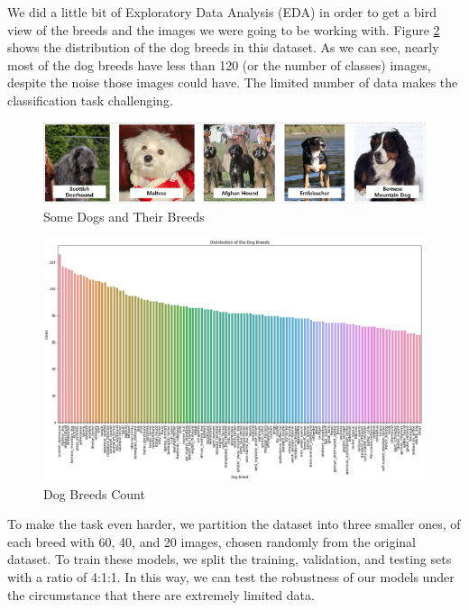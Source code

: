 \documentclass{article}
\begin{document}
We did a little bit of Exploratory Data Analysis (EDA) in order to get a bird view of the breeds and the images we were going to be working with. Figure \ref{fig:eda} shows the distribution of the dog breeds in this dataset. As we can see, nearly most of the dog breeds have less than 120 (or the number of classes) images, despite the noise those images could have. The limited number of data makes the classification task challenging.
\begin{figure}[h!]
    \centering
    \includegraphics[width=12cm]{dogs.PNG}
    \caption{Some Dogs and Their Breeds}
    \label{fig:dogs}
\end{figure}
\begin{figure}[h!]
    \centering
    \includegraphics[width=12cm]{eda.PNG}
    \caption{Dog Breeds Count}
    \label{fig:eda}
\end{figure}

To make the task even harder, we partition the dataset into three smaller ones, of each breed with 60, 40, and 20 images, chosen randomly from the original dataset. To train these models, we split the training, validation, and testing sets with a ratio of 4:1:1. In this way, we can test the robustness of our models under the circumstance that there are extremely limited data.
\end{document}
